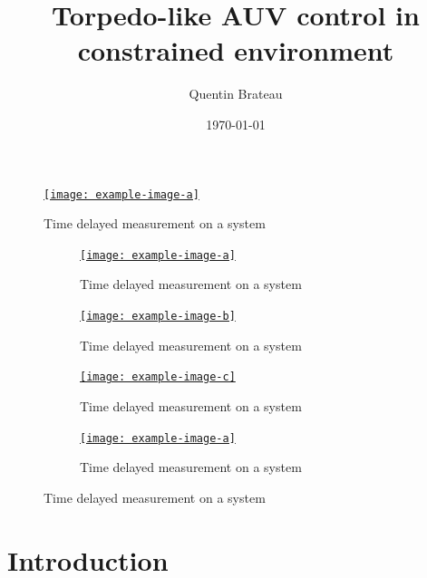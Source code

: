 \documentclass{beamer}
\title{Torpedo-like AUV control in constrained environment}
\date{\today}
\author{Quentin Brateau}
\institute{ENSTA Bretagne}
\begin{document}
    \maketitle

    \begin{frame}
        \begin{figure}
            \centering
            \href{run:frame_0_constraints.mp4?autostart&loop}{\texttt{[image: example-image-a]}}
            \caption{Time delayed measurement on a system}
            \label{fig:y equals x}
        \end{figure}
    \end{frame}
    
    \begin{frame}
        \begin{figure}
            \begin{subfigure}[b]{0.24\textwidth}
                \centering
                \href{run:frame_0_constraints.mp4?autostart&loop}{\texttt{[image: example-image-a]}}
                \caption{Time delayed measurement on a system}
                \label{fig:y equals x}
            \end{subfigure}
            \hfill
            \begin{subfigure}[b]{0.24\textwidth}
                \centering
                \href{run:frame_1_constraints.mp4?autostart&loop}{\texttt{[image: example-image-b]}}
                \caption{Time delayed measurement on a system}
                \label{fig:y equals x}
            \end{subfigure}
            \hfill
            \begin{subfigure}[b]{0.24\textwidth}
                \centering
                \href{run:frame_2_constraints.mp4?autostart&loop}{\texttt{[image: example-image-c]}}
                \caption{Time delayed measurement on a system}
                \label{fig:y equals x}
            \end{subfigure}
            \hfill
            \begin{subfigure}[b]{0.24\textwidth}
                \centering
                \href{run:frame_3_constraints.mp4?autostart&loop}{\texttt{[image: example-image-a]}}
                \caption{Time delayed measurement on a system}
                \label{fig:y equals x}
            \end{subfigure}
        \end{figure}
    \end{frame}

    \section{Introduction}
\end{document}
